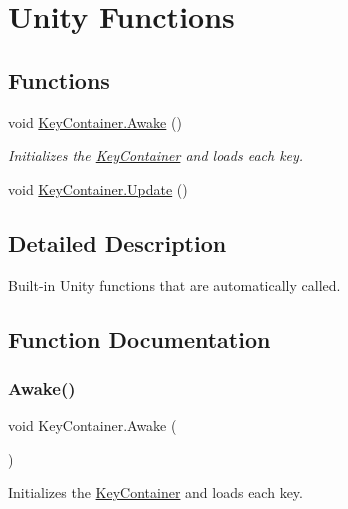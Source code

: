 \hypertarget{group___key_contain_unity}{}\section{Unity Functions}
\label{group___key_contain_unity}
\subsection*{Functions}
\begin{DoxyCompactItemize}
\item 
void \hyperlink{group___key_contain_unity_ga9e307b409b1e07b2be51a21afe5d7379}{Key\+Container.\+Awake} ()
\begin{DoxyCompactList}\small\item\em Initializes the \hyperlink{class_key_container}{Key\+Container} and loads each key. \end{DoxyCompactList}\item 
void \hyperlink{group___key_contain_unity_gae0e513a4ef9fd25c1e0f5f3bc53d9b5c}{Key\+Container.\+Update} ()
\end{DoxyCompactItemize}


\subsection{Detailed Description}
Built-\/in Unity functions that are automatically called. 

\subsection{Function Documentation}
\mbox{\label{group___key_contain_unity_ga9e307b409b1e07b2be51a21afe5d7379}} 
\subsubsection{\texorpdfstring{Awake()}{Awake()}}
{\footnotesize\ttfamily void Key\+Container.\+Awake (\begin{DoxyParamCaption}{ }\end{DoxyParamCaption})\hspace{0.3cm}{\ttfamily [private]}}



Initializes the \hyperlink{class_key_container}{Key\+Container} and loads each key. 



